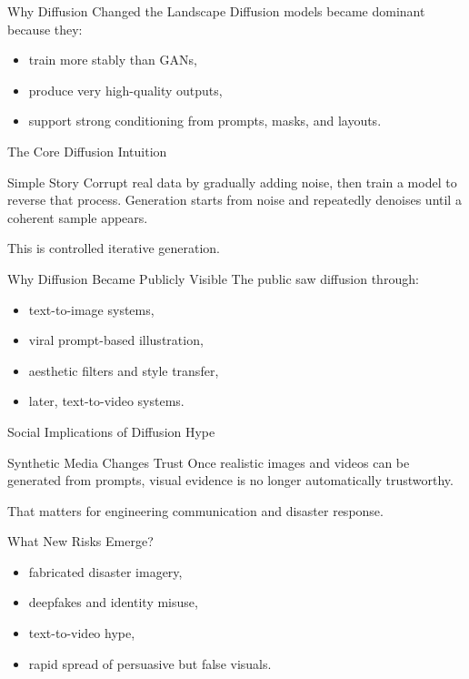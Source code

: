 \documentclass[12pt]{beamer}
\begin{document}
\begin{frame}{Why Diffusion Changed the Landscape}
  Diffusion models became dominant because they:
  \begin{itemize}
    \item train more stably than GANs,
    \item produce very high-quality outputs,
    \item support strong conditioning from prompts, masks, and layouts.
  \end{itemize}
\end{frame}

\begin{frame}{The Core Diffusion Intuition}
  \begin{conceptbox}{Simple Story}
    Corrupt real data by gradually adding noise, then train a model to reverse that process. Generation starts from noise and repeatedly denoises until a coherent sample appears.
  \end{conceptbox}

  This is controlled iterative generation.
\end{frame}

\begin{frame}{Why Diffusion Became Publicly Visible}
  The public saw diffusion through:
  \begin{itemize}
    \item text-to-image systems,
    \item viral prompt-based illustration,
    \item aesthetic filters and style transfer,
    \item later, text-to-video systems.
  \end{itemize}
\end{frame}

\begin{frame}{Social Implications of Diffusion Hype}
  \begin{warningbox}{Synthetic Media Changes Trust}
    Once realistic images and videos can be generated from prompts, visual evidence is no longer automatically trustworthy.
  \end{warningbox}

  That matters for engineering communication and disaster response.
\end{frame}

\begin{frame}{What New Risks Emerge?}
  \begin{itemize}
    \item fabricated disaster imagery,
    \item deepfakes and identity misuse,
    \item text-to-video hype,
    \item rapid spread of persuasive but false visuals.
  \end{itemize}
\end{frame}
\end{document}
